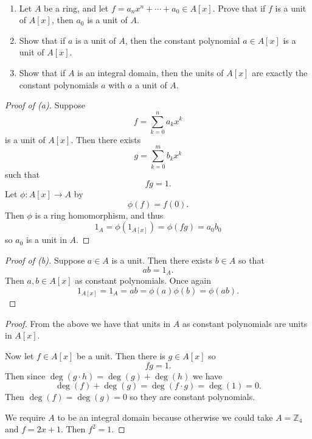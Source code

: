 \documentclass[11pt]{article}
\begin{document}
\begin{prob}
    \ 
    \begin{enumerate}[label=(\alph*)]
        \item Let $A$ be a ring, and let 
            $f = a_nx^n + \cdots + a_0 \in A[x]$. Prove 
            that if $f$ is a unit of $A[x]$, then 
            $a_0$ is a unit of $A$.
        \item Show that if $a$ is a unit of $A$, then the 
            constant polynomial $a \in A[x]$ is a unit of 
            $A[x]$. 
        \item Show that if $A$ is an integral domain, 
            then the units of $A[x]$ are exactly the constant 
            polynomials $a$ with $a$ a unit of $A$. 
    \end{enumerate}
\end{prob}
\begin{proof}[Proof of (a)]
    Suppose 
    \[
        f = \sum_{k=0}^n a_kx^k
    \]
    is a unit of $A[x]$. Then there exists 
    \[
        g = \sum_{k=0}^m b_kx^k
    \]
    such that 
    \[
        fg = 1. 
    \]
    Let $\phi : A[x] \to A$ by 
    \[
        \phi(f) = f(0).
    \]
    Then $\phi$ is a ring homomorphism, and thus 
    \[
        1_A = \phi(1_{A[x]}) 
        = \phi(fg) = a_0 b_0 
    \]
    so $a_0$ is a unit in $A$. 
\end{proof}
\begin{proof}[Proof of (b)]
    Suppose $a \in A$ is a unit. Then there 
    exists $b \in A$ so that 
    \[
        ab = 1_A. 
    \]
    Then $a,b \in A[x]$ as constant polynomials. 
    Once again 
    \[
        1_{A[x]} = 1_A = 
        ab = \phi(a)\phi(b) 
        = \phi(ab). 
    \]
\end{proof}
\begin{proof}
    From the above we have that 
    units in $A$ as constant polynomials 
    are units in $A[x]$.  

    Now let $f \in A[x]$ be a unit. Then 
    there is $g \in A[x]$ so 
    \[
        fg = 1. 
    \]
    Then since $\deg(g\cdot h) = \deg(g) + \deg(h)$ we have 
    \[
        \deg(f) + \deg(g) = \deg(f\cdot g) = \deg(1) = 0. 
    \]
    Then $\deg(f) = \deg(g) = 0$ so they are constant polynomials. 

    We require $A$ to be an integral domain because otherwise 
    we could take $A = \mathbb Z_4$ and $f = 2x + 1$. 
    Then $f^2 = 1$. 
\end{proof}
\end{document}
